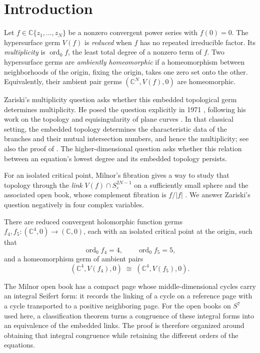\section{Introduction}\label{sec:introduction}

Let \(f\in\mathbb C\{z_1,\ldots,z_N\}\) be a nonzero convergent
power series with \(f(0)=0\). The hypersurface germ \(V(f)\) is
\emph{reduced} when \(f\) has no repeated irreducible factor. Its
\emph{multiplicity} is
\(\operatorname{ord}_0f\), the least total degree of a nonzero term
of \(f\). Two hypersurface germs are \emph{ambiently homeomorphic}
if a homeomorphism between neighborhoods of the origin, fixing the
origin, takes one zero set onto the other. Equivalently, their ambient
pair germs \((\mathbb C^N,V(f),0)\) are homeomorphic.

Zariski's multiplicity question asks whether this embedded
topological germ determines multiplicity. He posed the question
explicitly in 1971 \cite{Zariski1971}, following his work on the
topology and equisingularity of plane curves
\cite{Zariski1932,Zariski1965}. In that classical setting, the
embedded topology determines the characteristic data of the branches
and their mutual intersection numbers, and hence the multiplicity;
see also the proof of \cite[Theorem~3.1]{KoikeParusinski2010}.
The higher-dimensional question asks whether this relation between
an equation's lowest degree and its embedded topology persists.

For an isolated critical point, Milnor's fibration gives a way to
study that topology through the \emph{link}
\(V(f)\cap S^{2N-1}_\varepsilon\) on a sufficiently small sphere
and the associated open book, whose complement fibration is
\(f/|f|\) \cite{Milnor1968}.
We answer Zariski's question negatively in four complex variables.

\begin{theorem}\label{thm:main}
There are reduced convergent holomorphic function germs
\(f_4,f_5\colon(\mathbb C^4,0)\to(\mathbb C,0)\), each with an isolated
critical point at the origin, such that
\[
   \operatorname{ord}_0f_4=4,\qquad
   \operatorname{ord}_0f_5=5,
\]
and a homeomorphism germ of ambient pairs
\[
   (\mathbb C^4,V(f_4),0)
      \;\cong\;
   (\mathbb C^4,V(f_5),0).
\]
\end{theorem}

The Milnor open book has a compact page whose middle-dimensional
cycles carry an integral Seifert form: it records the linking of a
cycle on a reference page with a cycle transported to a positive
neighboring page. For the open books on \(S^7\) used here, a
classification theorem turns a congruence of these integral forms
into an equivalence of the embedded links. The proof is therefore
organized around obtaining that integral congruence while retaining
the different orders of the equations.

